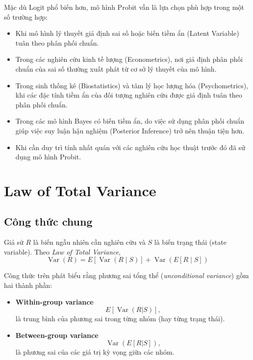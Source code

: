 Mặc dù Logit phổ biến hơn, mô hình Probit vẫn là lựa chọn phù hợp trong một số trường hợp:
\begin{itemize}
\item Khi mô hình lý thuyết giả định sai số hoặc biến tiềm ẩn (Latent Variable) tuân theo phân phối chuẩn.
\item Trong các nghiên cứu kinh tế lượng (Econometrics), nơi giả định phân phối chuẩn của sai số thường xuất phát từ cơ sở lý thuyết của mô hình.
\item Trong sinh thống kê (Biostatistics) và tâm lý học lượng hóa (Psychometrics), khi các đặc tính tiềm ẩn của đối tượng nghiên cứu được giả định tuân theo phân phối chuẩn.
\item Trong các mô hình Bayes có biến tiềm ẩn, do việc sử dụng phân phối chuẩn giúp việc suy luận hậu nghiệm (Posterior Inference) trở nên thuận tiện hơn.
\item Khi cần duy trì tính nhất quán với các nghiên cứu học thuật trước đó đã sử dụng mô hình Probit.
\end{itemize}


\section{Law of Total Variance}
\label{sec:Law_of_Total_Variance}

\subsection*{Công thức chung}
Giả sử $R$ là biến ngẫu nhiên cần nghiên cứu và $S$ là biến trạng thái (state variable). Theo \textit{Law of Total Variance},
\begin{equation}
\boxed{
\operatorname{Var}(R)
=
E\!\left[\operatorname{Var}(R\mid S)\right]
+
\operatorname{Var}\!\left(E[R\mid S]\right)
}
\end{equation}

Công thức trên phát biểu rằng phương sai tổng thể (\textit{unconditional variance}) gồm hai thành phần:

\begin{itemize}
    \item \textbf{Within-group variance}
    \[
    E[\operatorname{Var}(R|S)],
    \]
    là trung bình của phương sai trong từng nhóm (hay từng trạng thái).

    \item \textbf{Between-group variance}
    \[
    \operatorname{Var}(E[R|S]),
    \]
    là phương sai của các giá trị kỳ vọng giữa các nhóm.
\end{itemize}

